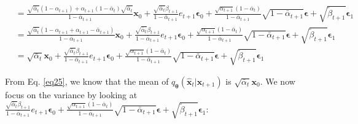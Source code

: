 \documentclass{article} \usepackage{iclr2024_conference,times}
\begin{document}
\begin{align}
& = \frac{\sqrt{\bar{\alpha}_{t}} (1-\alpha_{t+1})  + \alpha_{t+1}(1-\bar{\alpha}_{t}) \sqrt{\bar{\alpha}_{t}} }{1-\bar{\alpha}_{t+1}}  \pmb{x}_{0} + \frac{\sqrt{\bar{\alpha}_{t}} \beta_{t+1}}{1-\bar{\alpha}_{t+1}} e_{t+1}\pmb{\epsilon}_0 + \frac{\sqrt{\alpha_{t+1}}(1-\bar{\alpha}_{t})}{1-\bar{\alpha}_{t+1}} \sqrt{1 -\bar{\alpha}_{t+1}} \pmb{\epsilon} + \sqrt{ \tilde{\beta}_{t+1}} \pmb{\epsilon}_1 \nonumber \\
& = \frac{\sqrt{\bar{\alpha}_{t}} (1-\alpha_{t+1} + \alpha_{t+1} - \bar{\alpha}_{t+1})} {1-\bar{\alpha}_{t+1}}  \pmb{x}_{0} + \frac{\sqrt{\bar{\alpha}_{t}} \beta_{t+1}}{1-\bar{\alpha}_{t+1}} e_{t+1}\pmb{\epsilon}_0 + \frac{\sqrt{\alpha_{t+1}}(1-\bar{\alpha}_{t})}{1-\bar{\alpha}_{t+1}} \sqrt{1 -\bar{\alpha}_{t+1}} \pmb{\epsilon} + \sqrt{ \tilde{\beta}_{t+1}} \pmb{\epsilon}_1 \nonumber\\
& = \sqrt{\bar{\alpha}_{t}} \pmb{x}_{0} + \frac{\sqrt{\bar{\alpha}_{t}} \beta_{t+1}}{1-\bar{\alpha}_{t+1}} e_{t+1} \pmb{\epsilon}_0 + \frac{\sqrt{\alpha_{t+1}}(1-\bar{\alpha}_{t})}{1-\bar{\alpha}_{t+1}} \sqrt{1 -\bar{\alpha}_{t+1}} \pmb{\epsilon} + \sqrt{ \tilde{\beta}_{t+1}} \pmb{\epsilon}_1 \label{eq25}
\end{align}

\noindent
From Eq. \ref{eq25}, we know that the mean of $q_{\pmb{\theta}}(\hat{\pmb{x}}_{t} | \pmb{x}_{t+1})$ is $ \sqrt{\bar{\alpha}_{t}} \pmb{x}_{0}$. We now focus on the variance by looking at $\frac{\sqrt{\bar{\alpha}_{t}} \beta_{t+1}}{1-\bar{\alpha}_{t+1}} e_{t+1}\pmb{\epsilon}_0 + \frac{\sqrt{\alpha_{t+1}}(1-\bar{\alpha}_{t})}{1-\bar{\alpha}_{t+1}} \sqrt{1 -\bar{\alpha}_{t+1}} \pmb{\epsilon} + \sqrt{ \tilde{\beta}_{t+1}} \pmb{\epsilon}_1$:
\end{document}
